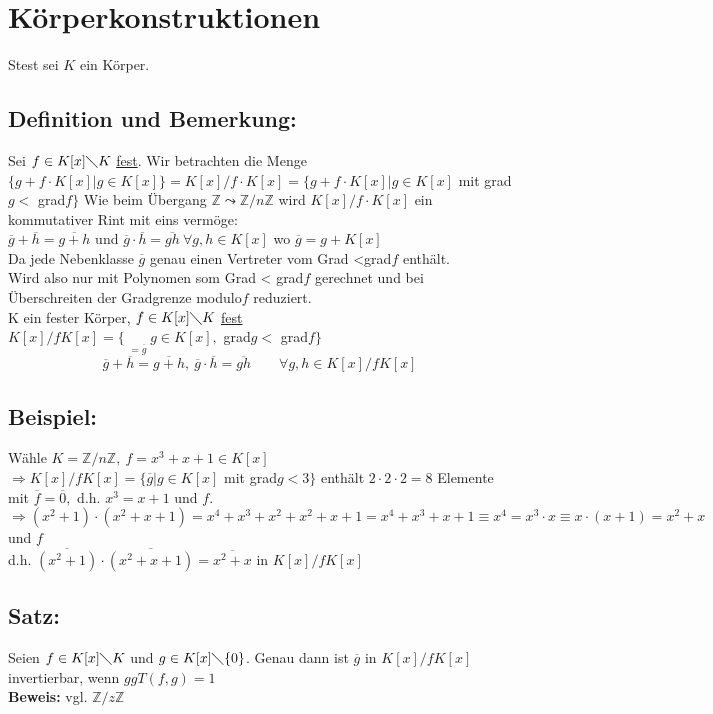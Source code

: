 \section{Körperkonstruktionen}
Stest sei $K$ ein Körper.
%
%
%
\subsection{Definition und Bemerkung:}
Sei $f \in K[x] \diagdown K$ \underline{fest}. Wir betrachten die Menge $\{g + f \cdot K[x]|g \in K[x]\} = K[x]/f \cdot K[x] = \{g+f\cdot K[x]|g \in K[x]$ mit grad$g <$ grad$f\}$ Wie beim Übergang $\mathbb{Z}\leadsto\mathbb{Z}/n\mathbb{Z}$ wird $K[x]/f \cdot K[x]$ ein kommutativer Rint mit eins vermöge: \\
$\overline{g} + \overline{h} = \overline{g+h}$ und $\overline{g} \cdot \overline{h} = \overline{gh} \ \forall g,h \in K[x]$ wo $ \overline{g} = g + K[x]$\\
Da jede Nebenklasse $\overline{g}$ genau einen Vertreter vom Grad <grad$f$ enthält.\\
Wird also nur mit Polynomen som Grad < grad$f$ gerechnet und bei Überschreiten der Gradgrenze modulo$f$ reduziert. \\
K ein fester Körper, $f \in K[x]\diagdown K$ \underline{fest}\\
$K[x]/fK[x] = \{\mathop{\underbrace{g+f K[x]|}}\limits_{=\overline{g}}g\in K[x],$ grad$g <$ grad$f\}$\\
\begin{equation*}
\overline{g} + \overline{h} = \overline{g+h}, \ \overline{g} \cdot \overline{h} = \overline{gh} \qquad \forall g,h \in K[x]/fK[x]
\end{equation*}
%
%
%
\subsection{Beispiel:}
Wähle $K=\mathbb{Z}/n\mathbb{Z}, \ f=x^{3}+x+1 \in K[x]$\\
$\Rightarrow K[x]/fK[x] = \{\overline{g}|g\in K[x]$ mit grad$g < 3\}$ enthält $ 2 \cdot 2 \cdot 2 = 8$ Elemente mit $\overline{f}=\overline{0},$ d.h. $x^{3} = x+1$ und $f$.\\
$\Rightarrow(x^{2}+1)\cdot(x^{2}+x+1)=x^{4}+x^{3}+x^{2}+x^{2}+x+1=x^{4}+x^{3}+x+1\equiv x^{4}=x^{3}\cdot x \equiv x \cdot(x+1)=x^{2}+x$ und $f$\\
d.h. $\overline{(x^{2}+1)}\cdot\overline{(x^{2}+x+1)}=\overline{x^{2}+x}$ in $K[x]/fK[x]$
%
%
%
\subsection{Satz:}
Seien $f \in K[x] \diagdown K$ und $g \in K[x]\diagdown \{0\}$. Genau dann ist $\overline{g}$ in $K[x]/fK[x]$ invertierbar, wenn $ggT(f,g)=1$\\
\textbf{Beweis:} vgl. $\mathbb{Z}/z\mathbb{Z}$
%
%
%
